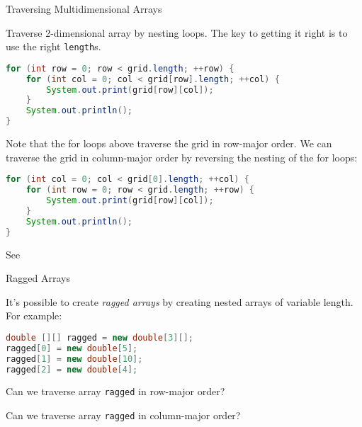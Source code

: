 \documentclass{beamer}
\begin{document}
\begin{frame}[fragile]{Traversing Multidimensional Arrays}


Traverse 2-dimensional array by nesting loops.  The key to getting it right is to use the right {\tt length}s.
\vspace{-.05in}
\begin{lstlisting}[language=Java]
for (int row = 0; row < grid.length; ++row) {
    for (int col = 0; col < grid[row].length; ++col) {
        System.out.print(grid[row][col]);
    }
    System.out.println();
}
\end{lstlisting}
Note that the for loops above traverse the grid in row-major order.  We can traverse the grid in column-major order by reversing the nesting of the for loops:
\vspace{-.05in}
\begin{lstlisting}[language=Java]
for (int col = 0; col < grid[0].length; ++col) {
    for (int row = 0; row < grid.length; ++row) {
        System.out.print(grid[row][col]);
    }
    System.out.println();
}
\end{lstlisting}
\vspace{-.05in}
See 

\end{frame}


\begin{frame}[fragile]{Ragged Arrays}


It's possible to create {\it ragged arrays} by creating nested arrays of variable length.  For example:
\begin{lstlisting}[language=Java]
double [][] ragged = new double[3][];
ragged[0] = new double[5];
ragged[1] = new double[10];
ragged[2] = new double[4];
\end{lstlisting}

Can we traverse array {\tt ragged} in row-major order?

Can we traverse array {\tt ragged} in column-major order?

\end{frame}
\end{document}
